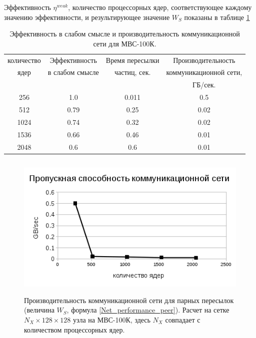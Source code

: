 Эффективность $\eta^{weak}$, количество процессорных ядер, соответствующее каждому значению эффективности, и результирующее значение $W_S$ показаны в таблице \ref{MVS100K_W_S} 

\begin{table}[ht]
\caption{Эффективность в слабом смысле и производительность коммуникационной сети для МВС-100К.}
\begin{center}
	\begin{tabular}{|c|c|c|c|}
		\hline
		количество  & Эффективность & Время пересылки & Производительность  \\
		ядер        & в слабом смысле & частиц, сек.    & коммуникационной сети, \\
		             &                 &                 &  ГБ/сек. \\\hline
		256           & 1.0             &     0.011       & 0.5\\
		512           & 0.79            &     0.25        & 0.02\\
		1024          & 0.74            &     0.32        & 0.02\\
		1536          & 0.66            &     0.46        & 0.01\\	
		2048          & 0.6             &     0.6         & 0.01 \\
		\hline
	\end{tabular}
	\label{MVS100K_W_S}
\end{center}
\end{table}

\begin{figure}[h]
	\begin{center}
		\includegraphics[height=7cm,keepaspectratio]{images/W_S_MVS_100K_on_weak_eff.png}
		\caption{
			Производительность коммуникационной сети для парных пересылок (величина $W_S$, формула \ref{Net_performance_peer}). Расчет на сетке $N_X \times 128 \times 128$ узла на МВС-100К, здесь $N_X$ совпадает с количеством процессорных ядер. 
		}
		\label{scale_W_S_MVS_100K}
	\end{center} 
\end{figure}

